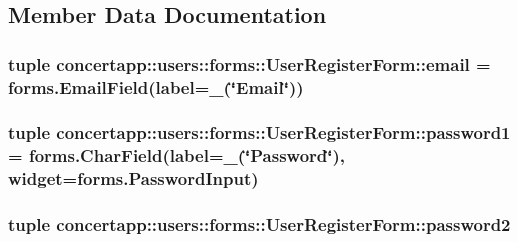 \subsection{Member Data Documentation}
\hypertarget{classconcertapp_1_1users_1_1forms_1_1_user_register_form_a9b9bfa2a3100f3025068edee155a8a04}{
\subsubsection[{email}]{\setlength{\rightskip}{0pt plus 5cm}tuple {\bf concertapp::users::forms::UserRegisterForm::email} = forms.EmailField(label=\_\-(\char`\"{}Email\char`\"{}))}}
\label{classconcertapp_1_1users_1_1forms_1_1_user_register_form_a9b9bfa2a3100f3025068edee155a8a04}
\hypertarget{classconcertapp_1_1users_1_1forms_1_1_user_register_form_aa1a336ebd6e4b3db159adddc0fa4a5dd}{
\subsubsection[{password1}]{\setlength{\rightskip}{0pt plus 5cm}tuple {\bf concertapp::users::forms::UserRegisterForm::password1} = forms.CharField(label=\_\-(\char`\"{}Password\char`\"{}), widget=forms.PasswordInput)}}
\label{classconcertapp_1_1users_1_1forms_1_1_user_register_form_aa1a336ebd6e4b3db159adddc0fa4a5dd}
\hypertarget{classconcertapp_1_1users_1_1forms_1_1_user_register_form_aeab66be8612b1125afe40fe53a5ed579}{
\subsubsection[{password2}]{\setlength{\rightskip}{0pt plus 5cm}tuple {\bf concertapp::users::forms::UserRegisterForm::password2}}}
